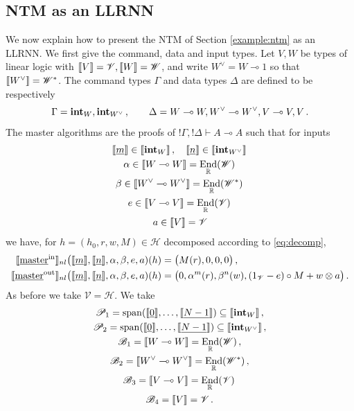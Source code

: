 \documentclass[english,letter paper,12pt,leqno]{article}
\theoremstyle{example}
\numberwithin{equation}{section}
\DeclareMathOperator{\End}{End}
\begin{document}
\subsection{NTM as an LLRNN}\label{section:ntmasllrnn}

We now explain how to present the NTM of Section \ref{example:ntm} as an LLRNN. We first give the command, data and input types. Let $V,W$ be types of linear logic with $\llbracket V \rrbracket = \mathscr{V}, \llbracket W \rrbracket = \mathscr{W}$, and write $W^{\vee} = W \multimap 1$ so that $\llbracket W^{\vee} \rrbracket = \mathscr{W}^*$. The command types $\Gamma$ and data types $\Delta$ are defined to be respectively
\[
\Gamma = \textbf{int}_W, \textbf{int}_{W^{\vee}}\,, \qquad \Delta = W \multimap W, W^{\vee} \multimap W^{\vee}, V \multimap V, V\,.
\]
The master algorithms are the proofs of ${!} \Gamma, {!} \Delta \vdash A \multimap A$ such that for inputs
\begin{gather*}
\den{\underline{m}} \in \den{\inta_W}\,,\quad \den{\underline{n}} \in \den{\inta_{W^{\vee}}}\,\\
\alpha \in \den{ W \multimap W} = \End_{\mathbb{R}}(\mathscr{W})\,\\
\beta \in \den{ W^{\vee} \multimap W^{\vee}} = \End_{\mathbb{R}}(\mathscr{W}^*)\,\\
e \in \den{V \multimap V} = \End_{\mathbb{R}}(\mathscr{V})\,\\
a \in \den{V} = \mathscr{V}
\end{gather*}
we have, for $h = (h_0,r,w,M) \in \mathscr{H}$ decomposed according to \eqref{eq:decomp},
\begin{align*}
\llbracket \underline{\textup{master}}^{\mathrm{in}} \rrbracket_{nl}\big( \llbracket \underline{m} \rrbracket, \llbracket \underline{n} \rrbracket, \alpha, \beta, e, a )(h) &= \big( M(r), 0, 0, 0 \big)\,,\\
\llbracket \underline{\textup{master}}^{\mathrm{out}} \rrbracket_{nl}\big( \llbracket \underline{m} \rrbracket, \llbracket \underline{n} \rrbracket, \alpha, \beta, e, a )(h) &= \big( 0, \alpha^m(r), \beta^n(w), (1_{\mathscr{V}} - e ) \circ M + w \otimes a\big)\,.
\end{align*}
As before we take $\mathscr{V} = \mathscr{H}$. We take
\begin{gather*}
\mathscr{P}_1 = \operatorname{span}(\den{\underline{0}}, \ldots, \den{\underline{N-1}}) \subseteq \den{\inta_W}\,,\\
\mathscr{P}_2 = \operatorname{span}(\den{\underline{0}}, \ldots, \den{\underline{N-1}}) \subseteq \den{\inta_{W^{\vee}}}\,,\\
\mathscr{B}_1 = \den{ W \multimap W} = \End_{\mathbb{R}}(\mathscr{W})\,,\\
\mathscr{B}_2 = \den{ W^{\vee} \multimap W^{\vee}} = \End_{\mathbb{R}}(\mathscr{W}^*)\,,\\
\mathscr{B}_3 = \den{ V \multimap V} = \End_{\mathbb{R}}(\mathscr{V})\,\\
\mathscr{B}_4 = \den{V} = \mathscr{V}\,.
\end{gather*}
\end{document}
